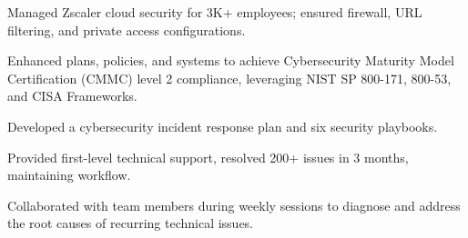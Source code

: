 \sectionspace %




\begin{tightitemize}

\item Managed Zscaler cloud security for 3K+ employees; ensured firewall, URL filtering, and private access configurations. %
\item Enhanced plans, policies, and systems to achieve Cybersecurity Maturity Model Certification (CMMC) level 2 compliance, leveraging NIST SP 800-171, 800-53, and CISA Frameworks.   %
\item Developed a cybersecurity incident response plan and six security playbooks. %

\end{tightitemize}

\sectionspace %




\begin{tightitemize}

\item Provided first-level technical support, resolved 200+ issues in 3 months, maintaining workflow. %
\item Collaborated with team members during weekly sessions to diagnose and address the root causes of recurring technical issues. %

\end{tightitemize}


